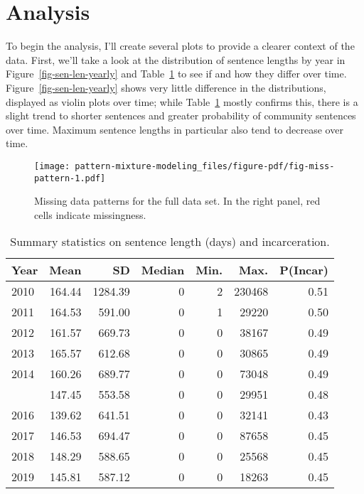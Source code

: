 \documentclass[
  letterpaper,
  DIV=11,
  numbers=noendperiod]{scrartcl}
\begin{document}
\hypertarget{analysis}{%
\section{Analysis}\label{analysis}}

To begin the analysis, I'll create several plots to provide a clearer
context of the data. First, we'll take a look at the distribution of
sentence lengths by year in Figure~\ref{fig-sen-len-yearly} and
Table~\ref{tbl-yearly-summary} to see if and how they differ over time.
Figure~\ref{fig-sen-len-yearly} shows very little difference in the
distributions, displayed as violin plots over time; while
Table~\ref{tbl-yearly-summary} mostly confirms this, there is a slight
trend to shorter sentences and greater probability of community
sentences over time. Maximum sentence lengths in particular also tend to
decrease over time.

\begin{figure}

{\centering \texttt{[image: pattern-mixture-modeling\_files/figure-pdf/fig-miss-pattern-1.pdf]}

}

\caption{\label{fig-miss-pattern}Missing data patterns for the full data
set. In the right panel, red cells indicate missingness.}

\end{figure}

\hypertarget{tbl-yearly-summary}{}
\begin{table}
\caption{\label{tbl-yearly-summary}Summary statistics on sentence length (days) and incarceration. }\tabularnewline

\centering
\begin{tabular}{lrrrrrr}
\toprule
Year & Mean & SD & Median & Min. & Max. & P(Incar)\\
\midrule
2010 & 164.44 & 1284.39 & 0 & 2 & 230468 & 0.51\\
2011 & 164.53 & 591.00 & 0 & 1 & 29220 & 0.50\\
2012 & 161.57 & 669.73 & 0 & 0 & 38167 & 0.49\\
2013 & 165.57 & 612.68 & 0 & 0 & 30865 & 0.49\\
2014 & 160.26 & 689.77 & 0 & 0 & 73048 & 0.49\\
\addlinespace
2015 & 147.45 & 553.58 & 0 & 0 & 29951 & 0.48\\
2016 & 139.62 & 641.51 & 0 & 0 & 32141 & 0.43\\
2017 & 146.53 & 694.47 & 0 & 0 & 87658 & 0.45\\
2018 & 148.29 & 588.65 & 0 & 0 & 25568 & 0.45\\
2019 & 145.81 & 587.12 & 0 & 0 & 18263 & 0.45\\
\bottomrule
\end{tabular}
\end{table}
\end{document}
